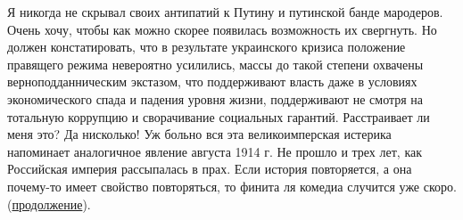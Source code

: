 Я никогда не скрывал своих антипатий к Путину и путинской банде мародеров.
Очень хочу, чтобы как можно скорее появилась возможность их свергнуть. Но
должен констатировать, что в результате украинского кризиса положение правящего
режима невероятно усилились, массы до такой степени охвачены
верноподданническим экстазом, что поддерживают власть  даже в условиях
экономического спада и падения уровня жизни, поддерживают не смотря на
тотальную коррупцию и сворачивание социальных гарантий.  Расстраивает ли меня
это? Да нисколько! Уж больно вся эта великоимперская истерика напоминает
аналогичное явление августа 1914 г. Не прошло и трех лет, как Российская
империя рассыпалась в прах. Если история повторяется, а она почему-то имеет
свойство повторяться, то  финита ля комедиа случится уже скоро.
(\href{https://kungurov.livejournal.com/85155.html}{продолжение}).
